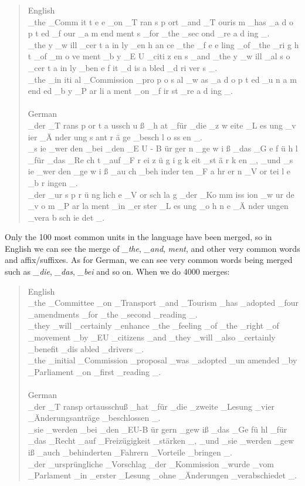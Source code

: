 \begin{quote}
	English\\
	\_the \_Comm it t e e \_on \_T ran s p ort \_and \_T ouris m \_has \_a d o p t ed \_f our \_a m end ment s \_for \_the \_sec ond \_re a d ing \_.\\
	\_the y \_w ill \_cer t a in ly \_en h an ce \_the \_f e e ling \_of \_the \_ri g h t \_of \_m o ve ment \_b y \_E U \_citi z en s \_and \_the y \_w ill \_al s o \_cer t a in ly \_ben e f it \_d is a bled \_d ri ver s \_.\\
	\_the \_in iti al \_Commission \_pro p o s al \_w as \_a d o p t ed \_u n a m end ed \_b y \_P ar li a ment \_on \_f ir st \_re a d ing \_.\\\\
	German\\
	\_der \_T rans p or t a ussch u ß \_h at \_für \_die \_z w eite \_L es ung \_v ier \_Ä nder ung s ant r ä ge \_besch l o ss en \_.\\
	\_s ie \_wer den \_bei \_den \_E U - B ür ger n \_ge w i ß \_das \_G e f ü h l \_für \_das \_Re ch t \_auf \_F r ei z ü g i g k eit \_st ä r k en \_, \_und \_s ie \_wer den \_ge w i ß \_au ch \_beh inder ten \_F a hr er n \_V or tei l e \_b r ingen \_.\\
	\_der \_ur s p r ü ng lich e \_V or sch la g \_der \_Ko mm iss ion \_w ur de \_v o m \_P ar la ment \_in \_er ster \_L es ung \_o h n e \_Ä nder ungen \_vera b sch ie det \_.
\end{quote}

Only the 100 most common units in the language have been merged, so in English we can see the merge of \emph{\_the}, \emph{\_and}, \emph{ment}, and other very common words and affix/suffixes. As for German, we can see very common words being merged such as \emph{\_die}, \emph{\_das}, \emph{\_bei} and so on. When we do 4000 merges:

\begin{quote}
	English\\
	\_the \_Committee \_on \_Transport \_and \_Tourism \_has \_adopted \_four \_amendments \_for \_the \_second \_reading \_.\\
	\_they \_will \_certainly \_enhance \_the \_feeling \_of \_the \_right \_of \_movement \_by \_EU \_citizens \_and \_they \_will \_also \_certainly \_benefit \_dis abled \_drivers \_.\\
	\_the \_initial \_Commission \_proposal \_was \_adopted \_un amended \_by \_Parliament \_on \_first \_reading \_.\\\\
	German\\
	\_der \_T ransp ortausschuß \_hat \_für \_die \_zweite \_Lesung \_vier \_Änderungsanträge \_beschlossen \_.\\
	\_sie \_werden \_bei \_den \_EU-B ür gern \_gew iß \_das \_Ge fü hl \_für \_das \_Recht \_auf \_Freizügigkeit \_stärken \_, \_und \_sie \_werden \_gew iß \_auch \_behinderten \_Fahrern \_Vorteile \_bringen \_.\\
	\_der \_ursprüngliche \_Vorschlag \_der \_Kommission \_wurde \_vom \_Parlament \_in \_erster \_Lesung \_ohne \_Änderungen \_verabschiedet \_.
\end{quote}


